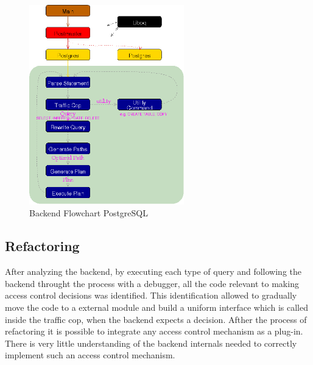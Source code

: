 %
\begin{figure}[!ht]
  \centering
    \includegraphics[width=0.6\textwidth]{img/backend_flowchart.png}
    \caption{Backend Flowchart PostgreSQL \protect \footnotemark}
\end{figure}
%
%
\FloatBarrier
%
\subsection{Refactoring}
%
After analyzing the backend, by executing each type of query and following the backend throught the process with a debugger, all the code relevant to making access control decisions was identified.
%
This identification allowed to gradually move the code to a external module and build a uniform interface which is called inside the traffic cop, when the backend expects a decision.
%
Afther the process of refactoring it is possible to integrate any access control mechanism as a plug-in.
%
There is very little understanding of the backend internals needed to correctly implement such an access control mechanism.
